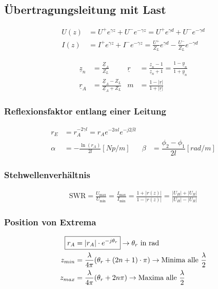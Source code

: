 \subsection{Übertragungsleitung mit Last}



\begin{align*}
    U(z) & = U^+ e^{\gamma z} + U^- e^{-\gamma z} = U^+ e^{\gamma d} + U^ - e^{-\gamma d}                      \\
    I(z) & = I^+ e^{\gamma z} + I^- e^{-\gamma z} = \frac{U^+}{Z_L}e^{\gamma d} - \frac{U^-}{Z_L}e^{-\gamma d}
\end{align*}

\begin{align*}
    \underline{z}_n & = \frac{\underline{Z}_A}{Z_L}                     & \underline{r} & = \frac{\underline{z}_n-1}{\underline{z}_n+1}= \frac{1-\underline{y}_n}{1+\underline{y}_n} \\
    \underline{r}_A & = \frac{\underline{Z}_A-Z_L}{\underline{Z}_A+Z_L} & m             & = \frac{1-|\underline{r}|}{1+|\underline{r}|}
\end{align*}

\subsubsection{Reflexionsfaktor entlang einer Leitung}
\begin{align*}
    r_E    & = r_A  ^{-2\gamma l} = r_A  e^{-2\alpha l} e^{-j2\beta l}                                                     \\
    \alpha & = -\frac{\ln(r_A)}{2l} [\si{Np/m}]                        & \beta & = \dfrac{\phi_2 -\phi_1}{2l} [\si{rad/m}]
\end{align*}

\subsubsection{Stehwellenverhältnis}
\begin{align*}
    \mathrm{SWR} = \frac{U_\text{max}}{U_\text{min}} =
    \frac{I_\text{max}}{I_\text{min}} = \frac{1+|r(z)|}{1-|r(z)|} =
    \frac{|U_H|+|U_R|}{|U_H|-|U_R|}
\end{align*}

\subsubsection{Position von Extrema}
\begin{align*}
    \Aboxed{r_A & = |r_A|\cdot e^{-j\theta_r}}\rightarrow\theta_r\text{ in rad}                                 \\
    z_{min}     & =\frac{\lambda}{4\pi}(\theta_r+(2n+1)\cdot\pi)\rightarrow\text{Minima alle }\frac{\lambda}{2} \\
    z_{max}     & =\frac{\lambda}{4\pi}(\theta_r+2n\pi)\rightarrow\text{Maxima alle }\frac{\lambda}{2}
\end{align*}

